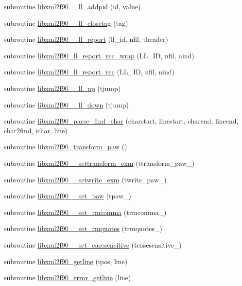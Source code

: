\begin{DoxyCompactItemize}
subroutine \hyperlink{libxml2f90_8f90__pp_8f90_a27b88f71526165bff7aec413fad71028}{libxml2f90\+\_\+\+\_\+ll\+\_\+addpid} (id, value)
\item 
subroutine \hyperlink{libxml2f90_8f90__pp_8f90_afd5fe490d70aae05e74fd17e87d31431}{libxml2f90\+\_\+\+\_\+ll\+\_\+closetag} (tag)
\item 
subroutine \hyperlink{libxml2f90_8f90__pp_8f90_a82abdf47d88bfca1f54ddd7fb0ca71f2}{libxml2f90\+\_\+\+\_\+ll\+\_\+report} (ll\+\_\+id, nfil, theader)
\item 
subroutine \hyperlink{libxml2f90_8f90__pp_8f90_aab03f23626a21bebdc849515ddbb2a84}{libxml2f90\+\_\+ll\+\_\+report\+\_\+rec\+\_\+wrap} (L\+L\+\_\+\+I\+D, nfil, nind)
\item 
subroutine \hyperlink{libxml2f90_8f90__pp_8f90_a5ddfde66a72fddf024606b83f50ecc3a}{libxml2f90\+\_\+ll\+\_\+report\+\_\+rec} (L\+L\+\_\+\+I\+D, nfil, nind)
\item 
subroutine \hyperlink{libxml2f90_8f90__pp_8f90_a4fdb16cf1b5c9a1b391a00dc270c835f}{libxml2f90\+\_\+\+\_\+ll\+\_\+up} (tjump)
\item 
subroutine \hyperlink{libxml2f90_8f90__pp_8f90_abe93b7544a083264c1c567ae64b7afa1}{libxml2f90\+\_\+\+\_\+ll\+\_\+down} (tjump)
\item 
subroutine \hyperlink{libxml2f90_8f90__pp_8f90_af6b4f4c6b9bd06993e7ab5cb607e7228}{libxml2f90\+\_\+parse\+\_\+find\+\_\+char} (charstart, linestart, charend, lineend, char2find, ichar, line)
\item 
subroutine \hyperlink{libxml2f90_8f90__pp_8f90_abf51b9d401b7210767c8a771a9ba2cf4}{libxml2f90\+\_\+transform\+\_\+paw} ()
\item 
subroutine \hyperlink{libxml2f90_8f90__pp_8f90_a2a5163c07b4567f5db11625bcdbb7607}{libxml2f90\+\_\+\+\_\+settransform\+\_\+exm} (ttransform\+\_\+paw\+\_\+)
\item 
subroutine \hyperlink{libxml2f90_8f90__pp_8f90_aa478c761a45bbb0eafdd081ea6cc0694}{libxml2f90\+\_\+\+\_\+setwrite\+\_\+exm} (twrite\+\_\+paw\+\_\+)
\item 
subroutine \hyperlink{libxml2f90_8f90__pp_8f90_ac3295351747cc53a1b37a87e4f99449d}{libxml2f90\+\_\+\+\_\+set\+\_\+paw} (tpaw\+\_\+)
\item 
subroutine \hyperlink{libxml2f90_8f90__pp_8f90_a853486e07f72af447dd5879e95f96c8d}{libxml2f90\+\_\+\+\_\+set\+\_\+rmcomma} (trmcomma\+\_\+)
\item 
subroutine \hyperlink{libxml2f90_8f90__pp_8f90_a88da78fbb7daa3d56763c5fe13fe2b35}{libxml2f90\+\_\+\+\_\+set\+\_\+rmquotes} (trmquotes\+\_\+)
\item 
subroutine \hyperlink{libxml2f90_8f90__pp_8f90_a97c04842d1625e96827c3d32280408ec}{libxml2f90\+\_\+\+\_\+set\+\_\+casesensitive} (tcasesensitive\+\_\+)
\item 
subroutine \hyperlink{libxml2f90_8f90__pp_8f90_abef5a4be7710d60ad11aab5a59fe5325}{libxml2f90\+\_\+getline} (ipos, line)
\item 
subroutine \hyperlink{libxml2f90_8f90__pp_8f90_ae1a542a061a5705a796b5373b0dcaf1b}{libxml2f90\+\_\+error\+\_\+getline} (line)
\end{DoxyCompactItemize}
